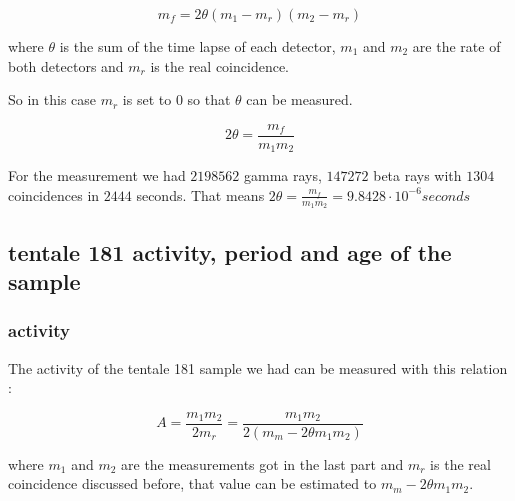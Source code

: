 \documentclass[a4paper,12pt,oneside]{article}
\def \be {\begin{equation}}
\def \ee {\end{equation}}
\begin{document}
\be
	m_f = 2\theta (m_1-m_r) (m_2-m_r)
\ee

where $\theta$ is the sum of the time lapse of each detector, $m_1$ and $m_2$ are the rate of both detectors and $m_r$ is the real coincidence. 

So in this case $m_r$ is set to $0$ so that $\theta$ can be measured.

\be
	2\theta = \frac{m_f}{m_1 m_2}
\ee



For the measurement we had $2198562$ gamma rays, $147272$ beta rays with $1304$ coincidences in $2444$ seconds.
That means
$2\theta=\frac{m_f}{m_1m_2}                                                      = 9.8428\cdot10^{-6} seconds$










\subsection{tentale 181 activity, period and age of the sample}


\subsubsection{activity}


	The activity of the tentale 181 sample we had can be measured with this relation :

	\be
		A = \frac{m_1 m_2}{2 m_r} = \frac{m_1 m_2}{2(m_m - 2\theta m_1 m_2)}
	\ee

	where $m_1$ and $m_2$ are the measurements got in the last part and $m_r$ is the real coincidence discussed before, that value can be estimated to $m_m - 2\theta m_1 m_2$.
\end{document}
